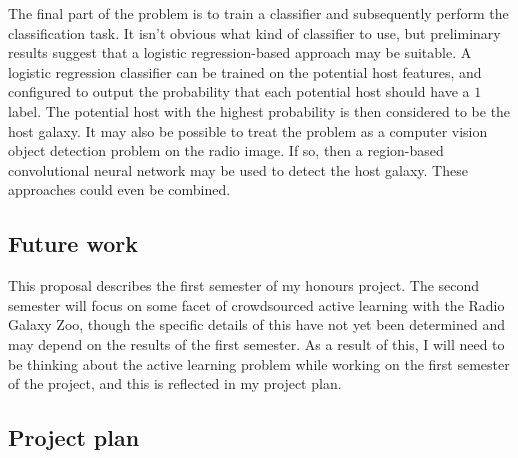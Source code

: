 \documentclass[a4paper]{article}
\begin{document}
        The final part of the problem is to train a classifier and subsequently perform the classification task. It isn't obvious what kind of classifier to use, but preliminary results suggest that a logistic regression-based approach may be suitable. A logistic regression classifier can be trained on the potential host features, and configured to output the probability that each potential host should have a $1$ label. The potential host with the highest probability is then considered to be the host galaxy. It may also be possible to treat the problem as a computer vision object detection problem on the radio image. If so, then a region-based convolutional neural network may be used to detect the host galaxy. These approaches could even be combined.




    \subsection*{Future work}

        This proposal describes the first semester of my honours project. The second semester will focus on some facet of crowdsourced active learning with the Radio Galaxy Zoo, though the specific details of this have not yet been determined and may depend on the results of the first semester. As a result of this, I will need to be thinking about the active learning problem while working on the first semester of the project, and this is reflected in my project plan.

    \subsection*{Project plan}
\end{document}
